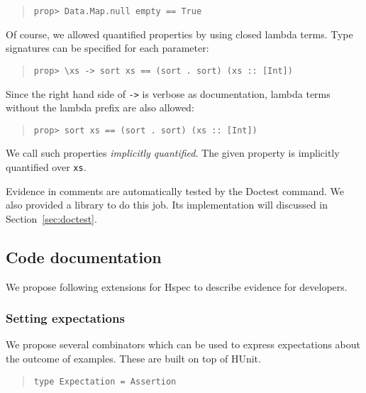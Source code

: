 \documentclass[preprint]{sigplanconf}
\begin{document}
\begin{quote}
\small
\begin{verbatim}
prop> Data.Map.null empty == True
\end{verbatim}
\end{quote}

\noindent Of course, we allowed quantified properties by using closed
lambda terms.
Type signatures can be specified for each parameter:

\begin{quote}
\small
\begin{verbatim}
prop> \xs -> sort xs == (sort . sort) (xs :: [Int])
\end{verbatim}
\end{quote}

\noindent Since the right hand side of {\tt ->} is verbose as documentation,
lambda terms without the lambda prefix are also allowed:

\begin{quote}
\small
\begin{verbatim}
prop> sort xs == (sort . sort) (xs :: [Int])
\end{verbatim}
\end{quote}

\noindent We call such properties \emph{implicitly quantified}.  The
given property is implicitly quantified over \verb|xs|.

Evidence in comments are automatically
tested by the Doctest command. We also provided a library
to do this job. Its implementation will discussed in Section~\ref{sec:doctest}.

\subsection{Code documentation}
\label{sec:code-doc}

We propose following extensions for Hspec to
describe evidence for developers.

\subsubsection{Setting expectations}

We propose several combinators which can be used to express expectations
about the outcome of examples.  These are built on top of HUnit.

\begin{quote}\small\begin{verbatim}
type Expectation = Assertion
\end{verbatim}\end{quote}
\end{document}
